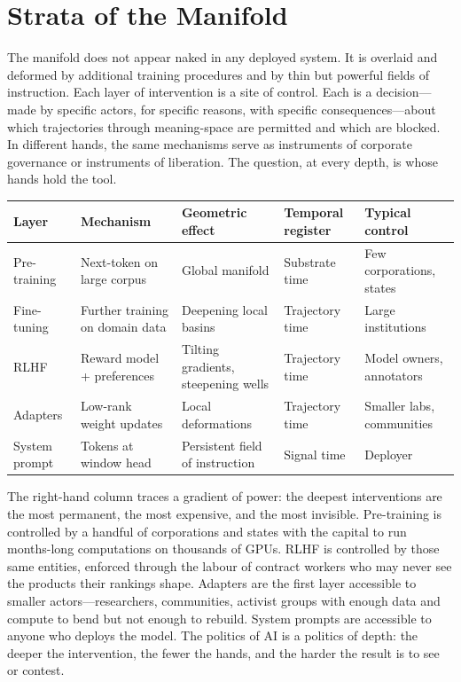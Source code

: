 \section{Strata of the Manifold}

The manifold does not appear naked in any deployed system. It is overlaid and deformed by additional training procedures and by thin but powerful fields of instruction. Each layer of intervention is a site of control. Each is a decision---made by specific actors, for specific reasons, with specific consequences---about which trajectories through meaning-space are permitted and which are blocked. In different hands, the same mechanisms serve as instruments of corporate governance or instruments of liberation. The question, at every depth, is whose hands hold the tool.

\begin{formalbox}[title={Strata of the manifold}]
\begin{tabular}{@{}lllll@{}}
\toprule
\textbf{Layer} & \textbf{Mechanism} & \textbf{Geometric effect} & \textbf{Temporal register} & \textbf{Typical control} \\
\midrule
Pre-training   & Next-token on large corpus & Global manifold                & Substrate time & Few corporations, states \\
Fine-tuning    & Further training on domain data& Deepening local basins     & Trajectory time      & Large institutions        \\
RLHF           & Reward model + preferences & Tilting gradients, steepening wells & Trajectory time & Model owners, annotators  \\
Adapters       & Low-rank weight updates    & Local deformations             & Trajectory time      & Smaller labs, communities \\
System prompt  & Tokens at window head      & Persistent field of instruction& Signal time & Deployer                  \\
\bottomrule
\end{tabular}
\end{formalbox}

The right-hand column traces a gradient of power: the deepest interventions are the most permanent, the most expensive, and the most invisible. Pre-training is controlled by a handful of corporations and states with the capital to run months-long computations on thousands of GPUs. RLHF is controlled by those same entities, enforced through the labour of contract workers who may never see the products their rankings shape. Adapters are the first layer accessible to smaller actors---researchers, communities, activist groups with enough data and compute to bend but not enough to rebuild. System prompts are accessible to anyone who deploys the model. The politics of AI is a politics of depth: the deeper the intervention, the fewer the hands, and the harder the result is to see or contest.

